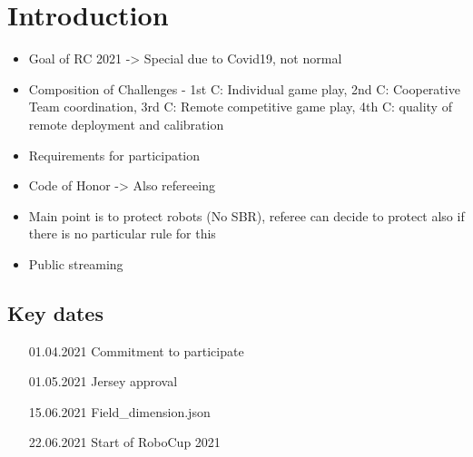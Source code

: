 \section{Introduction}

\begin{itemize}
    \item Goal of RC 2021 -> Special due to Covid19, not normal
    \item Composition of Challenges - 1st C: Individual game play, 2nd C: Cooperative Team coordination, 3rd C: Remote competitive game play, 4th C: quality of remote deployment and calibration 
    \item Requirements for participation
    \item Code of Honor -> Also refereeing
    \item Main point is to protect robots (No SBR), referee can decide to protect also if there is no particular rule for this
    \item Public streaming
\end{itemize}

\subsection{Key dates}

\begin{itemize}
    \item [01.04.2021] Commitment to participate
    \item [01.05.2021] Jersey approval
    \item [15.06.2021] Field\_dimension.json
    \item [22.06.2021] Start of RoboCup 2021
\end{itemize}